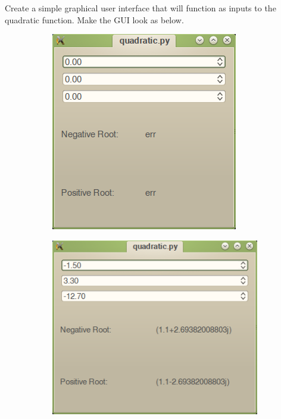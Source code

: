 \begin{problem}
Create a simple graphical user interface that will function as inputs to the quadratic function.
Make the GUI look as below.
\begin{figure}[H]
\centering
\begin{subfigure}[b]{.49\textwidth}
\includegraphics[width=\textwidth]{quadratic_view.png}
\end{subfigure}
\begin{subfigure}[b]{.49\textwidth}
\includegraphics[width=\textwidth]{quadratic_view2.png}
\end{subfigure}
\end{figure}

\end{problem}

